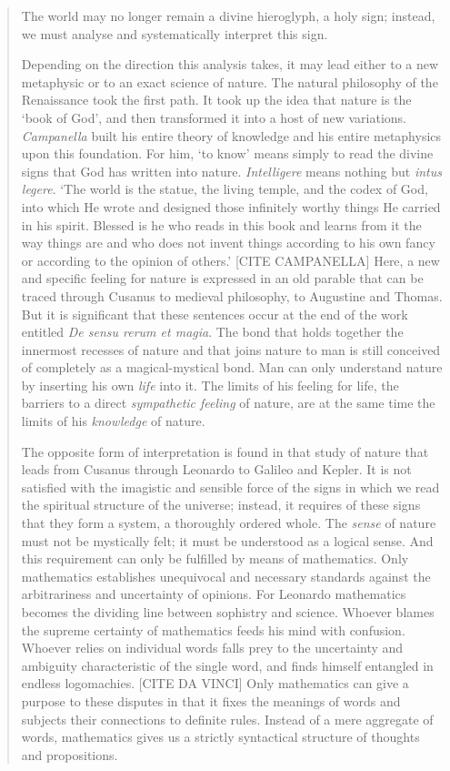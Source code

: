 \begin{quote}
    The world may no longer remain a divine hieroglyph, a holy sign; instead, we must analyse and systematically interpret this sign.

    Depending on the direction this analysis takes, it may lead either to a new metaphysic or to an exact science of nature.  The natural philosophy of the Renaissance took the first path.  It took up the idea that nature is the `book of God', and then transformed it into a host of new variations.  \emph{Campanella} built his entire theory of knowledge and his entire metaphysics upon this foundation.  For him, `to know' means simply to read the divine signs that God has written into nature.  \emph{Intelligere} means nothing but \emph{intus legere}.  `The world is the statue, the living temple, and the codex of God, into which He wrote and designed those infinitely worthy things He carried in his spirit.  Blessed is he who reads in this book and learns from it the way things are and who does not invent things according to his own fancy or according to the opinion of others.'  [CITE CAMPANELLA]  Here, a new and specific feeling for nature is expressed in an old parable that can be traced through Cusanus to medieval philosophy, to Augustine and Thomas.  But it is significant that these sentences occur at the end of the work entitled \emph{De sensu rerum et magia}.  The bond that holds together the innermost recesses of nature and that joins nature to man is still conceived of completely as a magical-mystical bond.  Man can only understand nature by inserting his own \emph{life} into it.  The limits of his feeling for life, the barriers to a direct \emph{sympathetic feeling} of nature, are at the same time the limits of his \emph{knowledge} of nature.

    The opposite form of interpretation is found in that study of nature that leads from Cusanus through Leonardo to Galileo and Kepler.  It is not satisfied with the imagistic and sensible force of the signs in which we read the spiritual structure of the universe; instead, it requires of these signs that they form a system, a thoroughly ordered whole.  The \emph{sense} of nature must not be mystically felt; it must be understood as a logical sense.  And this requirement can only be fulfilled by means of mathematics.  Only mathematics establishes unequivocal and necessary standards against the arbitrariness and uncertainty of opinions.  For Leonardo mathematics becomes the dividing line between sophistry and science.  Whoever blames the supreme certainty of mathematics feeds his mind with confusion.  Whoever relies on individual words falls prey to the uncertainty and ambiguity characteristic of the single word, and finds himself entangled in endless logomachies.  [CITE DA VINCI]  Only mathematics can give a purpose to these disputes in that it fixes the meanings of words and subjects their connections to definite rules.  Instead of a mere aggregate of words, mathematics gives us a strictly syntactical structure of thoughts and propositions.


\end{quote}
